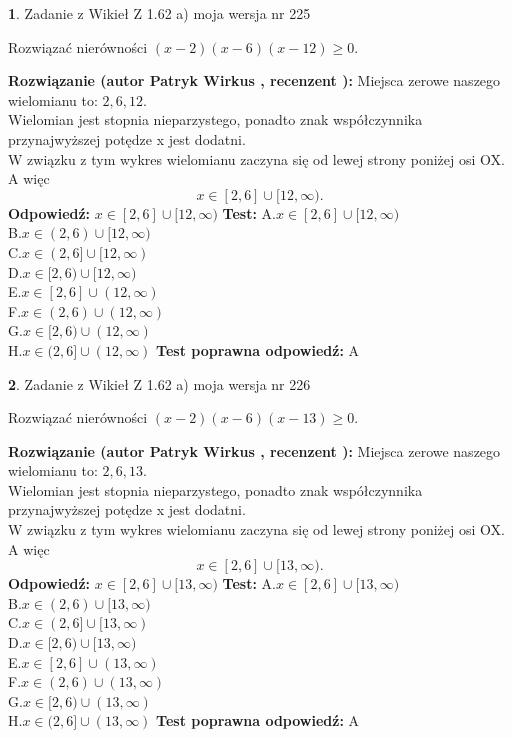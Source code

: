 \documentclass[12pt, a4paper]{article}
\theoremstyle{definition} %
\newtheorem{zad}{}
\newcommand{\zadStart}[1]{\begin{zad}#1\newline}
\newcommand{\zadStop}{\end{zad}}
\newcommand{\rozwStart}[2]{\noindent \textbf{Rozwiązanie (autor #1 , recenzent #2): }\newline}
\newcommand{\rozwStop}{\newline}
\newcommand{\odpStart}{\noindent \textbf{Odpowiedź:}\newline}
\newcommand{\odpStop}{\newline}
\newcommand{\testStart}{\noindent \textbf{Test:}\newline}
\newcommand{\testStop}{\newline}
\newcommand{\kluczStart}{\noindent \textbf{Test poprawna odpowiedź:}\newline}
\newcommand{\kluczStop}{\newline}
\begin{document}
\zadStart{Zadanie z Wikieł Z 1.62 a) moja wersja nr 225}

Rozwiązać nierówności $(x-2)(x-6)(x-12)\ge0$.
\zadStop
\rozwStart{Patryk Wirkus}{}
Miejsca zerowe naszego wielomianu to: $2, 6, 12$.\\
Wielomian jest stopnia nieparzystego, ponadto znak współczynnika przy\linebreak najwyższej potędze x jest dodatni.\\ W związku z tym wykres wielomianu zaczyna się od lewej strony poniżej osi OX. A więc $$x \in [2,6] \cup [12,\infty).$$
\rozwStop
\odpStart
$x \in [2,6] \cup [12,\infty)$
\odpStop
\testStart
A.$x \in [2,6] \cup [12,\infty)$\\
B.$x \in (2,6) \cup [12,\infty)$\\
C.$x \in (2,6] \cup [12,\infty)$\\
D.$x \in [2,6) \cup [12,\infty)$\\
E.$x \in [2,6] \cup (12,\infty)$\\
F.$x \in (2,6) \cup (12,\infty)$\\
G.$x \in [2,6) \cup (12,\infty)$\\
H.$x \in (2,6] \cup (12,\infty)$
\testStop
\kluczStart
A
\kluczStop



\zadStart{Zadanie z Wikieł Z 1.62 a) moja wersja nr 226}

Rozwiązać nierówności $(x-2)(x-6)(x-13)\ge0$.
\zadStop
\rozwStart{Patryk Wirkus}{}
Miejsca zerowe naszego wielomianu to: $2, 6, 13$.\\
Wielomian jest stopnia nieparzystego, ponadto znak współczynnika przy\linebreak najwyższej potędze x jest dodatni.\\ W związku z tym wykres wielomianu zaczyna się od lewej strony poniżej osi OX. A więc $$x \in [2,6] \cup [13,\infty).$$
\rozwStop
\odpStart
$x \in [2,6] \cup [13,\infty)$
\odpStop
\testStart
A.$x \in [2,6] \cup [13,\infty)$\\
B.$x \in (2,6) \cup [13,\infty)$\\
C.$x \in (2,6] \cup [13,\infty)$\\
D.$x \in [2,6) \cup [13,\infty)$\\
E.$x \in [2,6] \cup (13,\infty)$\\
F.$x \in (2,6) \cup (13,\infty)$\\
G.$x \in [2,6) \cup (13,\infty)$\\
H.$x \in (2,6] \cup (13,\infty)$
\testStop
\kluczStart
A
\kluczStop
\end{document}
